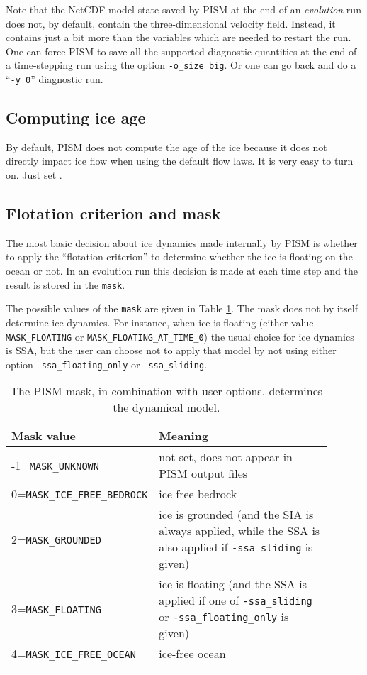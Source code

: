 Note that the NetCDF model state saved by PISM at the end of an \emph{evolution} run does not, by default, contain the three-dimensional velocity field.  Instead, it contains just a bit more than the variables which are needed to restart the run.  One can  force PISM to save all the supported diagnostic quantities at the end of a time-stepping run using the option \texttt{-o_size big}.  Or one can go back and do a ``\texttt{-y 0}'' diagnostic run.


\subsection{Computing ice age} \label{subsect:age}

By default, PISM does not compute the age of the ice because it does not directly impact ice flow when using the default flow laws. It is very easy to turn on.  Just set .

  
\subsection{Flotation criterion and mask} \label{subsect:floatmask}  The most basic decision about ice dynamics made internally by PISM is whether to apply the ``flotation criterion'' to determine whether the ice is floating on the ocean or not.  In an evolution run this decision is made at each time step and the result is stored in the \texttt{mask}.

The possible values of the \texttt{mask} are given in Table \ref{tab:maskvals}.  The mask does not by itself determine ice dynamics.  For instance, when ice is floating (either value \texttt{MASK_FLOATING} or \texttt{MASK_FLOATING_AT_TIME_0}) the usual choice for ice dynamics is SSA, but the user can choose not to apply that model by not using either option \texttt{-ssa_floating_only} or \texttt{-ssa_sliding}.

\begin{table}[ht]
  \centering
 \small
  \begin{tabular}{p{0.25\linewidth}p{0.65\linewidth}}
    \toprule
    \textbf{Mask value} & \textbf{Meaning}\\
    \midrule
    -1=\texttt{MASK_UNKNOWN} & not set, does not appear in PISM output files \\
    0=\texttt{MASK_ICE_FREE_BEDROCK} & ice free bedrock \\
    2=\texttt{MASK_GROUNDED}& ice is grounded (and the SIA is always applied, while the SSA is also applied if \texttt{-ssa_sliding} is given) \\
    3=\texttt{MASK_FLOATING} & ice is floating (and the SSA is applied if one of \texttt{-ssa_sliding} or \texttt{-ssa_floating_only} is given) \\
    4=\texttt{MASK_ICE_FREE_OCEAN} & ice-free ocean \\
    \\\bottomrule
  \end{tabular}
  \normalsize
  \caption{The PISM mask, in combination with user options, determines the dynamical model.}
  \label{tab:maskvals} 
\end{table}

